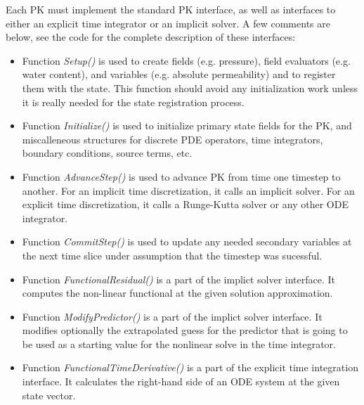 Each PK must implement the standard PK interface, as well as interfaces to either 
an explicit time integrator or an implicit solver.
A few comments are below, see the code for the complete description of these interfaces:
\begin{itemize}
\item Function {\it Setup()} is used to create fields (e.g. pressure), field evaluators
      (e.g. water content), and variables (e.g.
      absolute permeability) and to register them with the state.
      This function should avoid any initialization work unless it is really needed
      for the state registration process.

\item Function {\it Initialize()} is used to initialize primary state fields for the PK,
      and miscalleneous structures for discrete PDE operators, time integrators, 
      boundary conditions, source terms, etc.

\item Function {\it AdvanceStep()} is used to advance PK from time one timestep to another.
      For an implicit time discretization, it calls an implicit solver.
      For an explicit time discretization, it calls a Runge-Kutta solver or any other ODE
      integrator.

\item Function {\it CommitStep()} is used to update any needed secondary variables at 
      the next time slice under assumption that the timestep was sucessful. 

\item Function {\it FunctionalResidual()} is a part of the implict solver interface.
      It computes the non-linear functional at the given solution approximation.

\item Function {\it ModifyPredictor()} is a part of the implict solver interface.
      It modifies optionally the extrapolated guess for the predictor that is going to 
      be used as a starting value for the nonlinear solve in the time integrator.

\item Function {\it FunctionalTimeDerivative()} is a part of the explicit time integration
      interface. It calculates the right-hand side of an ODE system at the given state vector.
\end{itemize}

